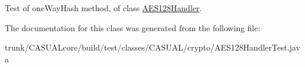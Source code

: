 Test of one\-Way\-Hash method, of class \hyperlink{class_c_a_s_u_a_l_1_1crypto_1_1_a_e_s128_handler}{A\-E\-S128\-Handler}. 

The documentation for this class was generated from the following file\-:\begin{DoxyCompactItemize}
\item 
trunk/\-C\-A\-S\-U\-A\-Lcore/build/test/classes/\-C\-A\-S\-U\-A\-L/crypto/A\-E\-S128\-Handler\-Test.\-java\end{DoxyCompactItemize}
